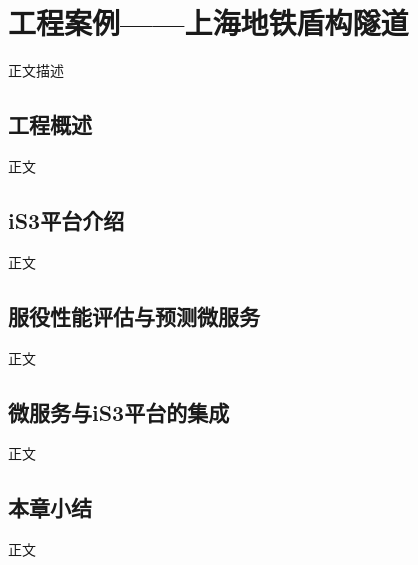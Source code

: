\chapter{工程案例——上海地铁盾构隧道}
\label{chap:case}

正文描述

\section{工程概述}

正文




\section{iS3平台介绍}

正文




\section{服役性能评估与预测微服务}

正文




\section{微服务与iS3平台的集成}

正文





\section{本章小结}

正文